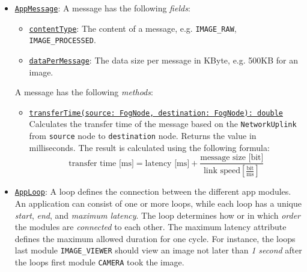 \begin{itemize}
    \item \underline{\texttt{AppMessage}}: A message has the following \textit{fields}:
    \begin{itemize}
        \item \underline{\texttt{contentType}}: The content of a message, e.g. \texttt{IMAGE\_RAW}, \texttt{IMAGE\_PROCESSED}.
        \item \underline{\texttt{dataPerMessage}}: The data size per message in KByte, e.g. 500KB for an image.
    \end{itemize}
    A message has the following \textit{methods}:
    \begin{itemize}
        \item \underline{\texttt{transferTime(source: FogNode, destination: FogNode): double}}\\
        Calculates the transfer time of the message based on the \texttt{NetworkUplink} from \texttt{source} node to \texttt{destination} node. Returns the value in milliseconds. The result is calculated using the following formula:
        \[\textrm{transfer time [ms]} = \textrm{latency [ms]} + \frac{\textrm{message size [bit]}}{\textrm{link speed} [\frac{\textrm{bit}}{\textrm{ms}}]}\]
    \end{itemize}
   
   \item \underline{\texttt{AppLoop}}: A loop defines the connection between the different app modules. An application can consist of one or more loops, while each loop has a unique \textit{start}, \textit{end}, and \textit{maximum latency}. The loop determines how or in which \textit{order} the modules are \textit{connected} to each other. The maximum latency attribute defines the maximum allowed duration for one cycle. For instance, the loops last module \texttt{IMAGE\_VIEWER} should view an image not later than \textit{1 second} after the loops first module \texttt{CAMERA} took the image.
   

\end{itemize}
